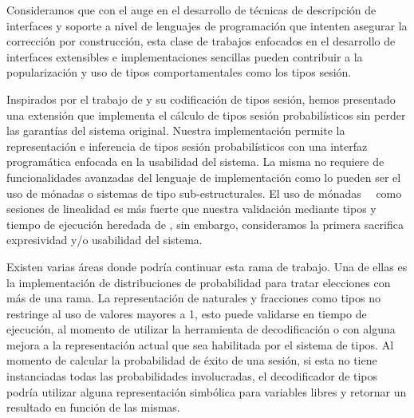 Consideramos que con el auge en el desarrollo de técnicas de descripción de
interfaces y soporte a nivel de lenguajes de programación que intenten asegurar
la corrección por construcción, esta clase de trabajos enfocados en el
desarrollo de interfaces extensibles e implementaciones sencillas pueden
contribuir a la popularización y uso de tipos comportamentales como los tipos
sesión.

Inspirados por el trabajo de \FuSe y su codificación de tipos sesión, hemos
presentado una extensión que implementa el cálculo de tipos sesión
probabilísticos sin perder las garantías del sistema original. Nuestra
implementación permite la representación e inferencia de tipos sesión
probabilísticos con una interfaz programática enfocada en la usabilidad del
sistema. La misma no requiere de funcionalidades avanzadas del lenguaje de
implementación como lo pueden ser el uso de mónadas o sistemas de tipo
sub-estructurales. El uso de mónadas~\cite{fmt18}~\cite{pucella08} como
sesiones de linealidad es más fuerte que nuestra validación mediante tipos y
tiempo de ejecución heredada de \FuSe, sin embargo, consideramos la primera
sacrifica expresividad y/o usabilidad del sistema.

Existen varias áreas donde podría continuar esta rama de trabajo. Una de ellas
es la implementación de distribuciones de probabilidad para tratar elecciones
con más de una rama. La representación de naturales y fracciones como tipos no
restringe al uso de valores mayores a 1, esto puede validarse en tiempo de
ejecución, al momento de utilizar la herramienta de decodificación o con alguna
mejora a la representación actual que sea habilitada por el sistema de tipos.
Al momento de calcular la probabilidad de éxito de una sesión, si esta no tiene
instanciadas todas las probabilidades involucradas, el decodificador de tipos
podría utilizar alguna representación simbólica para variables libres y
retornar un resultado en función de las mismas.
